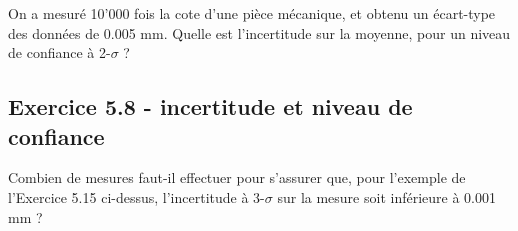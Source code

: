 \documentclass[main.tex]{subfiles}
\begin{document}
On a mesuré 10'000 fois la cote d'une pièce mécanique, et obtenu un écart-type des données de 0.005 mm. Quelle est l'incertitude sur la moyenne, pour un niveau de confiance à 2-$\sigma$ ?

\subsection*{Exercice 5.8 - incertitude et niveau de confiance}

Combien de mesures faut-il effectuer pour s'assurer que, pour l'exemple de l'Exercice 5.15 ci-dessus, l'incertitude à 3-$\sigma$ sur la mesure soit inférieure à 0.001 mm ?
\end{document}

